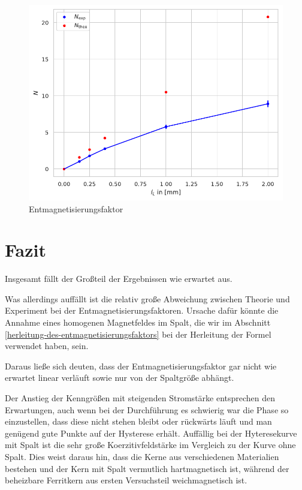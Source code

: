\documentclass[12pt,a4paper]{scrartcl}
\numberwithin{equation}{section} %
\renewcommand{\[}{} %
\renewcommand{\]}{\noindent} %
\begin{document}
\begin{figure}
\centering
\includegraphics{../media/B2.4/3.3.4_N.pdf}
\caption{Entmagnetisierungsfaktor}
\label{Abb: Entmagnetisierung}
\end{figure}

\hypertarget{fazit}{%
\section{Fazit}\label{fazit}}

Insgesamt fällt der Großteil der Ergebnissen wie erwartet aus.

Was allerdings auffällt ist die relativ große Abweichung zwischen Theorie und Experiment bei der Entmagnetisierungsfaktoren. Ursache dafür könnte die Annahme eines homogenen Magnetfeldes im Spalt, die wir im Abschnitt \ref{herleitung-des-entmagnetisierungsfaktors} bei der Herleitung der Formel verwendet haben, sein.

Daraus ließe sich deuten, dass der Entmagnetisierungsfaktor gar nicht wie erwartet linear verläuft sowie nur von der Spaltgröße abhängt.

Der Anstieg der Kenngrößen mit steigenden Stromstärke entsprechen den Erwartungen, auch wenn bei der Durchführung es schwierig war die Phase so einzustellen, dass diese nicht stehen bleibt oder rückwärts läuft und man genügend gute Punkte auf der Hysterese erhält. Auffällig bei der Hyteresekurve mit Spalt ist die sehr große Koerzitivfeldstärke im Vergleich zu der Kurve ohne Spalt. Dies weist daraus hin, dass die Kerne aus verschiedenen Materialien bestehen und der Kern mit Spalt vermutlich hartmagnetisch ist, während der beheizbare Ferritkern aus ersten Versuchsteil weichmagnetisch ist.
\end{document}
